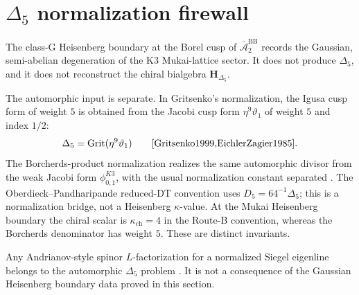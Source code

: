 \section{\texorpdfstring{$\Delta_5$}{Delta5} normalization firewall}
\label{sec:heisens-supplement}

\begin{remark}
\label{rem:heisens-1}
The class-G Heisenberg boundary at the Borel cusp of
$\bar{\mathcal A}_2^{\mathrm{BB}}$ records the Gaussian,
semi-abelian degeneration of the K3 Mukai-lattice sector. It does
not produce $\Delta_5$, and it does not reconstruct the chiral
bialgebra $\mathbf H_{\Delta_5}$.

The automorphic input is separate. In Gritsenko's normalization, the
Igusa cusp form of weight $5$ is obtained from the Jacobi cusp form
$\eta^9\vartheta_1$ of weight $5$ and index $1/2$:
\[
\Delta_5=\operatorname{Grit}(\eta^9\vartheta_1)
\qquad
\text{\cite{Gritsenko1999,EichlerZagier1985}.}
\]
The Borcherds-product normalization realizes the same automorphic
divisor from the weak Jacobi form $\phi_{0,1}^{K3}$, with the usual
normalization constant separated
\cite{Borcherds1998,GritsenkoNikulin1998}. The
Oberdieck--Pandharipande reduced-DT convention uses
$D_5=64^{-1}\Delta_5$; this is a normalization bridge, not a
Heisenberg $\kappa$-value. At the Mukai Heisenberg boundary the
chiral scalar is $\kappa_{\mathrm{ch}}=4$ in the Route-B convention,
whereas the Borcherds denominator has weight $5$. These are distinct
invariants.

Any Andrianov-style spinor $L$-factorization for a normalized Siegel
eigenline belongs to the automorphic
$\Delta_5$ problem \cite{Andrianov1974,Arthur2013Endoscopic}. It is
not a consequence of the Gaussian Heisenberg boundary data proved in
this section.
\end{remark}
